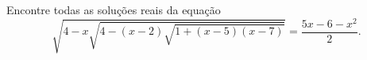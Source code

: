 Encontre todas as soluções reais da equação \[ \sqrt{4 - x \sqrt{ 4 - (x-2) \sqrt{1 + (x-5)(x-7)} } } = \frac{5x - 6 - x^2}{2}.\]
